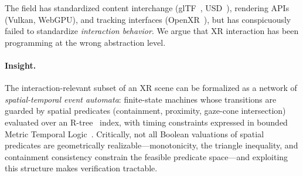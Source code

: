 \documentclass[11pt,a4paper]{article}
\begin{document}
The field has standardized content interchange (glTF~\cite{gltf2017},
USD~\cite{usd2019}), rendering APIs (Vulkan, WebGPU), and tracking interfaces
(OpenXR~\cite{openxr2019}), but has conspicuously failed to standardize
\emph{interaction behavior}.
We argue that XR interaction has been programming at the wrong abstraction level.

\paragraph{Insight.}
The interaction-relevant subset of an XR scene can be formalized as a network of
\emph{spatial-temporal event automata}: finite-state machines whose transitions
are guarded by spatial predicates (containment, proximity, gaze-cone intersection)
evaluated over an R-tree~\cite{guttman1984} index, with timing constraints expressed
in bounded Metric Temporal Logic~\cite{koymans1990}.
Critically, not all Boolean valuations of spatial predicates are geometrically
realizable---monotonicity, the triangle inequality, and containment consistency
constrain the feasible predicate space---and exploiting this structure makes
verification tractable.
\end{document}
